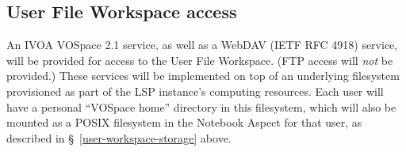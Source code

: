 \subsection{User File Workspace access}\label{user-workspace-access}

An IVOA VOSpace 2.1 service, as well as a WebDAV (IETF RFC 4918) service, will be provided for access to the User File Workspace.
(FTP access will \emph{not} be provided.)
These services will be implemented on top of an underlying filesystem provisioned as part of the LSP instance's computing resources.
Each user will have a personal ``VOSpace home'' directory in this filesystem, which will also be mounted as a POSIX filesystem in the Notebook Aspect for that user, as described in \S~\ref{user-workspace-storage} above.
